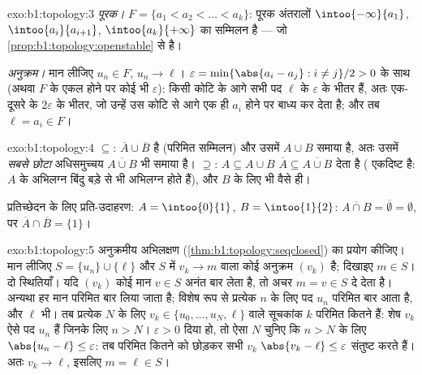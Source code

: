 \begin{solution}{exo:b1:topology:3}
\emph{पूरक।} $F = \{a_1 < a_2 < \dots < a_k\}$: पूरक  अंतरालों
$\intoo{-\infty}{a_1}$, $\intoo{a_i}{a_{i+1}}$, $\intoo{a_k}{+\infty}$ का
सम्मिलन है --- जो \cref{prop:b1:topology:openstable} से  है।

\emph{अनुक्रम।} मान लीजिए $u_n \in F$, $u_n \to \ell$। $\varepsilon =
\min\{\abs{a_i - a_j} : i \neq j\}/2 > 0$ के साथ (अथवा $F$ के एकल 
होने पर कोई भी $\varepsilon$): किसी कोटि के आगे सभी पद $\ell$ के
$\varepsilon$ के भीतर हैं, अतः एक-दूसरे के $2\varepsilon$ के भीतर, जो उन्हें
उस कोटि से आगे एक ही $a_i$ होने पर बाध्य कर देता है; और तब $\ell = a_i \in
F$।
\end{solution}

\begin{solution}{exo:b1:topology:4}
$\subseteq$: $\overline A \cup \overline B$  है (परिमित सम्मिलन) और
उसमें $A \cup B$ समाया है, अतः उसमें \emph{सबसे छोटा}  अधिसमुच्चय
$\overline{A \cup B}$ भी समाया है। $\supseteq$: $A \subseteq A \cup B$
$\overline A \subseteq \overline{A \cup B}$ देता है ( एकदिष्ट है: $A$
के अभिलग्न बिंदु बड़े  से भी अभिलग्न होते हैं), और $B$ के लिए भी वैसे
ही।

प्रतिच्छेदन के लिए प्रति-उदाहरण: $A = \intoo{0}{1}$, $B = \intoo{1}{2}$:
$\overline{A \cap B} = \overline\emptyset = \emptyset$, पर $\overline A \cap
\overline B = \{1\}$।
\end{solution}

\begin{solution}{exo:b1:topology:5}
अनुक्रमीय अभिलक्षण (\cref{thm:b1:topology:seqclosed}) का प्रयोग कीजिए। मान
लीजिए $S = \{u_n\} \cup \{\ell\}$ और $S$ में $v_k \to m$ वाला कोई अनुक्रम
$(v_k)$ है; दिखाइए $m \in S$। दो स्थितियाँ। यदि $(v_k)$ कोई मान $v \in S$
अनंत बार लेता है, तो अचर  $m = v \in S$ दे देता है। अन्यथा हर मान
परिमित बार लिया जाता है; विशेष रूप से प्रत्येक $n$ के लिए पद $u_n$ परिमित
बार आता है, और $\ell$ भी। तब प्रत्येक $N$ के लिए $v_k \in \{u_0, \dots, u_N,
\ell\}$ वाले सूचकांक $k$ परिमित कितने हैं: शेष $v_k$ ऐसे पद $u_n$ हैं जिनके
लिए $n > N$। $\varepsilon > 0$ दिया हो, तो ऐसा $N$ चुनिए कि $n > N$ के लिए
$\abs{u_n - \ell} \leq \varepsilon$: तब परिमित कितने को छोड़कर सभी $v_k$
$\abs{v_k - \ell} \leq \varepsilon$ संतुष्ट करते हैं। अतः $v_k \to \ell$,
इसलिए $m = \ell \in S$।
\end{solution}

